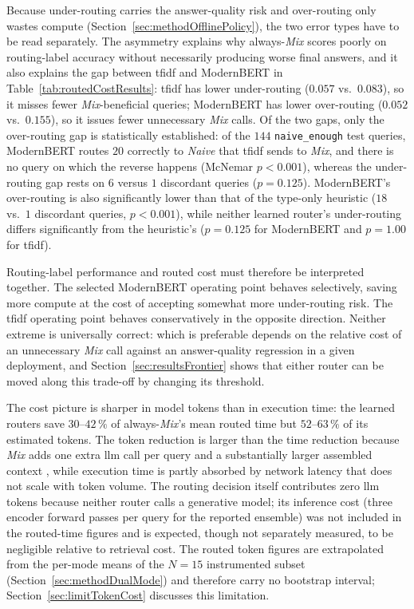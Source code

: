 \documentclass[english, bibtex]{kththesis}               %
\numberwithin{listing}{chapter}
\begin{document}
Because under-routing carries the answer-quality risk and over-routing only wastes compute (Section~\ref{sec:methodOfflinePolicy}), the two error types have to be read separately. The asymmetry explains why always-\emph{Mix} scores poorly on routing-label accuracy without necessarily producing worse final answers, and it also explains the gap between \gls{tfidf} and ModernBERT in Table~\ref{tab:routedCostResults}: \gls{tfidf} has lower under-routing ($0.057$ vs.\ $0.083$), so it misses fewer \emph{Mix}-beneficial queries; ModernBERT has lower over-routing ($0.052$ vs.\ $0.155$), so it issues fewer unnecessary \emph{Mix} calls. Of the two gaps, only the over-routing gap is statistically established: of the $144$ \texttt{naive\_enough} test queries, ModernBERT routes $20$ correctly to \emph{Naive} that \gls{tfidf} sends to \emph{Mix}, and there is no query on which the reverse happens (McNemar $p < 0.001$), whereas the under-routing gap rests on $6$ versus $1$ discordant queries ($p = 0.125$). ModernBERT's over-routing is also significantly lower than that of the type-only heuristic ($18$ vs.\ $1$ discordant queries, $p < 0.001$), while neither learned router's under-routing differs significantly from the heuristic's ($p = 0.125$ for ModernBERT and $p = 1.00$ for \gls{tfidf}).

Routing-label performance and routed cost must therefore be interpreted together. The selected ModernBERT operating point behaves selectively, saving more compute at the cost of accepting somewhat more under-routing risk. The \gls{tfidf} operating point behaves conservatively in the opposite direction. Neither extreme is universally correct: which is preferable depends on the relative cost of an unnecessary \emph{Mix} call against an answer-quality regression in a given deployment, and Section~\ref{sec:resultsFrontier} shows that either router can be moved along this trade-off by changing its threshold.

The cost picture is sharper in model tokens than in execution time: the learned routers save $30$--$42\,\%$ of always-\emph{Mix}'s mean routed time but $52$--$63\,\%$ of its estimated tokens. The token reduction is larger than the time reduction because \emph{Mix} adds one extra \gls{llm} call per query and a substantially larger assembled context \cite{lightrag2024,microsoft2024graphragcosts}, while execution time is partly absorbed by network latency that does not scale with token volume. The routing decision itself contributes zero \gls{llm} tokens because neither router calls a generative model; its inference cost (three encoder forward passes per query for the reported ensemble) was not included in the routed-time figures and is expected, though not separately measured, to be negligible relative to retrieval cost. The routed token figures are extrapolated from the per-mode means of the $N = 15$ instrumented subset (Section~\ref{sec:methodDualMode}) and therefore carry no bootstrap interval; Section~\ref{sec:limitTokenCost} discusses this limitation.
\end{document}
